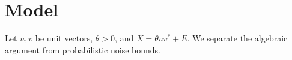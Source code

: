 \documentclass[11pt]{article}
\begin{document}
\section{Model}
Let $u,v$ be unit vectors, $\theta>0$, and $X=\theta uv^*+E$.
We separate the algebraic argument from probabilistic noise bounds.

\end{document}
